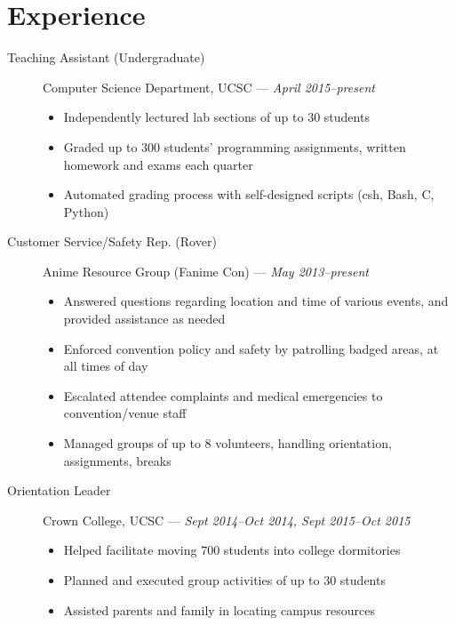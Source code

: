 \documentclass[10pt]{article}
\begin{document}
\section*{Experience}
\begin{description}
  \item[Teaching Assistant (Undergraduate)] Computer Science Department, UCSC ---
    \textit{April 2015--present}
    \begin{itemize}
      \item Independently lectured lab sections of up to $30$ students
      \item Graded up to $300$ students' programming assignments, written
        homework and exams each quarter
      \item Automated grading process with self-designed scripts (csh, Bash, C,
        Python)
    \end{itemize}
  \item[Customer Service/Safety Rep. (Rover)] Anime Resource Group (Fanime Con) --- \textit{May 2013--present}
    \begin{itemize}
      \item Answered questions regarding location and time of various events,
        and provided assistance as needed
      \item Enforced convention policy and safety by patrolling badged areas, at
        all times of day
      \item Escalated attendee complaints and medical emergencies to
        convention/venue staff
      \item Managed groups of up to $8$ volunteers, handling orientation,
        assignments, breaks
    \end{itemize}
  \item[Orientation Leader] Crown College, UCSC --- \textit{Sept 2014--Oct
    2014, Sept 2015--Oct 2015}
    \begin{itemize}
      \item Helped facilitate moving $700$ students into college dormitories
      \item Planned and executed group activities of up to $30$ students
      \item Assisted parents and family in locating campus resources
    \end{itemize}
\end{description}
\end{document}

